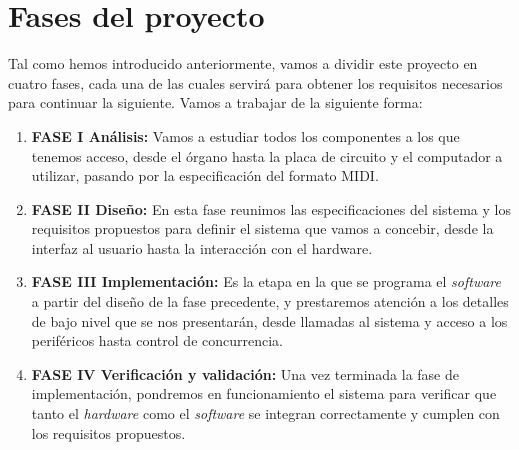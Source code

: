 \section{Fases del proyecto}

Tal como hemos introducido anteriormente, vamos a dividir este proyecto en cuatro fases, cada una de las cuales servirá para obtener los requisitos necesarios para continuar la siguiente. Vamos a trabajar de la siguiente forma:

\begin{enumerate}
	\item \textbf{FASE I \textemdash Análisis:} Vamos a estudiar todos los componentes a los que tenemos acceso, desde el órgano hasta la placa de circuito y el computador a utilizar, pasando por la especificación del formato MIDI.
	
	\item \textbf{FASE II \textemdash Diseño:} En esta fase reunimos las especificaciones del sistema y los requisitos propuestos para definir el sistema que vamos a concebir, desde la interfaz al usuario hasta la interacción con el hardware.
	
	\item \textbf{FASE III \textemdash Implementación:} Es la etapa en la que se programa el \textit{software} a partir del diseño de la fase precedente, y prestaremos atención a los detalles de bajo nivel que se nos presentarán, desde llamadas al sistema y acceso a los periféricos hasta control de concurrencia.
	
	\item \textbf{FASE IV \textemdash Verificación y validación:} Una vez terminada la fase de implementación, pondremos en funcionamiento el sistema para verificar que tanto el \textit{hardware} como el \textit{software} se integran correctamente y cumplen con los requisitos propuestos.
	
\end{enumerate}

\clearpage{\cleardoublepage}
\clearpage{\pagestyle{empty}\cleardoublepage}
